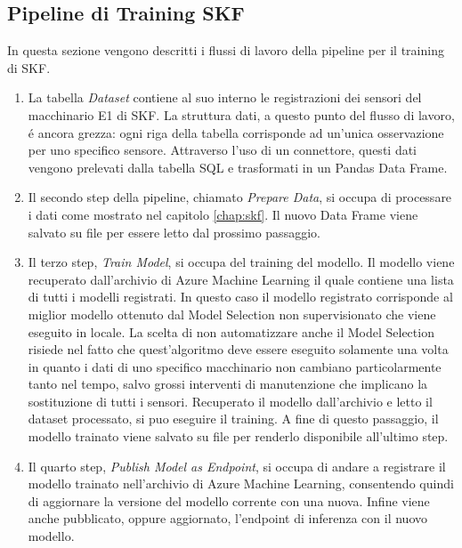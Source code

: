 \subsection{Pipeline di Training SKF}
In questa sezione vengono descritti i flussi di lavoro della pipeline per il training di SKF.
\begin{enumerate}
	\item La tabella \textit{Dataset} contiene al suo interno le registrazioni dei sensori del macchinario E1 di SKF. La struttura dati, a questo punto del flusso di lavoro, é ancora grezza: ogni riga della tabella corrisponde ad un'unica osservazione per uno specifico sensore. Attraverso l'uso di un connettore, questi dati vengono prelevati dalla tabella SQL e trasformati in un Pandas Data Frame.
	\item Il secondo step della pipeline, chiamato \textit{Prepare Data}, si occupa di processare i dati come mostrato nel capitolo \ref{chap:skf}. Il nuovo Data Frame viene salvato su file per essere letto dal prossimo passaggio.
	\item Il terzo step, \textit{Train Model}, si occupa del training del modello. Il modello viene recuperato dall'archivio di Azure Machine Learning il quale contiene una lista di tutti i modelli registrati. In questo caso il modello registrato corrisponde al miglior modello ottenuto dal Model Selection non supervisionato che viene eseguito in locale. La scelta di non automatizzare anche il Model Selection risiede nel fatto che quest'algoritmo deve essere eseguito solamente una volta in quanto i dati di uno specifico macchinario non cambiano particolarmente tanto nel tempo, salvo grossi interventi di manutenzione che implicano la sostituzione di tutti i sensori. Recuperato il modello dall'archivio e letto il dataset processato, si puo eseguire il training. A fine di questo passaggio, il modello trainato viene salvato su file per renderlo disponibile all'ultimo step.
	\item Il quarto step, \textit{Publish Model as Endpoint}, si occupa di andare a registrare il modello trainato nell'archivio di Azure Machine Learning, consentendo quindi di aggiornare la versione del modello corrente con una nuova. Infine viene anche pubblicato, oppure aggiornato, l'endpoint di inferenza con il nuovo modello.
\end{enumerate}


